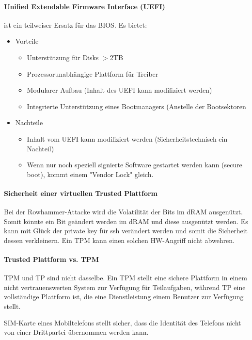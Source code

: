 \documentclass[a4paper,12pt]{article}
\begin{document}
\paragraph{Unified Extendable Firmware Interface (UEFI)} ist ein teilweiser Ersatz für das BIOS.
Es bietet:
\begin{itemize}
\item Vorteile
    \begin{itemize}
    \item Unterstützung für Disks $>$2TB
    \item Prozessorunabhängige Plattform für Treiber
    \item Modularer Aufbau (Inhalt des UEFI kann modifiziert werden)
    \item Integrierte Unterstützung eines Bootmanagers (Anstelle der Bootsektoren
    \end{itemize}
\item Nachteile
    \begin{itemize}
    \item Inhalt vom UEFI kann modifiziert werden (Sicherheitstechnisch ein Nachteil)
    \item Wenn nur noch speziell signierte Software gestartet werden kann (secure boot), kommt einem "Vendor Lock" gleich.
    \end{itemize}
\end{itemize}

\paragraph{Sicherheit einer virtuellen Trusted Plattform}
Bei der Rowhammer-Attacke wird die Volatilität der Bits im dRAM ausgenützt. Somit könnte ein Bit geändert werden im dRAM und diese ausgenützt werden. Es kann mit Glück der private key für ssh verändert werden und somit die Sicherheit dessen verkleinern. Ein TPM kann einen solchen HW-Angriff nicht abwehren.

\paragraph{Trusted Plattform vs. TPM}
TPM und TP sind nicht dasselbe. Ein TPM stellt eine sichere Plattform in einem nicht vertrauenswerten System zur Verfügung für Teilaufgaben, während TP eine vollständige Plattform ist, die eine Dienstleistung einem Benutzer zur Verfügung stellt.

SIM-Karte eines Mobiltelefons stellt sicher, dass die Identität des Telefons nicht von einer Drittpartei übernommen werden kann.
\end{document}
